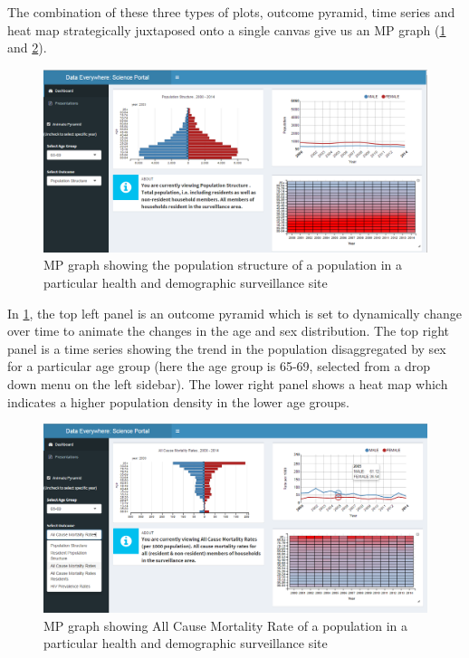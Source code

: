 The combination of these three types of plots, outcome pyramid, time series and heat map strategically juxtaposed onto a single canvas give us an MP graph (\ref{fig2} and \ref{fig3}).

\begin{figure}[!ht] 
\centering
\includegraphics[scale=0.3]{./Chapter5/images/shinymp1}
\caption{MP graph showing the population structure of a population in a particular health and demographic surveillance site}
\label{fig2}
\end{figure}

In \ref{fig2}, the top left panel is an outcome pyramid which is set to dynamically change over time to animate the changes in the age and sex distribution. The top right panel is a time series showing the trend in the population disaggregated by sex for a particular age group (here the age group is 65-69, selected from a drop down menu on the left sidebar). The lower right panel shows a heat map which indicates a higher population density in the lower age groups. 

\begin{figure}[!ht] 
\centering
\includegraphics[scale=0.3]{./Chapter5/images/shinymp2}
\caption{MP graph showing All Cause Mortality Rate of a population in a particular health and demographic surveillance site}
\label{fig3}
\end{figure}

